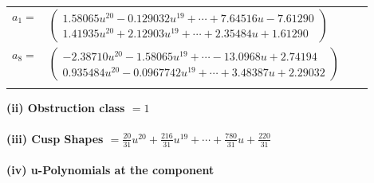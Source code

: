 \documentclass[1p]{elsarticle_modified}
\theoremstyle{definition}
\begin{document}
\begin{tabular}{m{7pt} m{180pt} m{7pt} m{180pt} }
\flushright $a_{1}=$&$\begin{pmatrix}1.58065 u^{20}-0.129032 u^{19}+\cdots+7.64516 u-7.61290\\1.41935 u^{20}+2.12903 u^{19}+\cdots+2.35484 u+1.61290\end{pmatrix}$ \\
\flushright $a_{8}=$&$\begin{pmatrix}-2.38710 u^{20}-1.58065 u^{19}+\cdots-13.0968 u+2.74194\\0.935484 u^{20}-0.0967742 u^{19}+\cdots+3.48387 u+2.29032\end{pmatrix}$\\&\end{tabular}
\flushleft \textbf{(ii) Obstruction class $= 1$}\\~\\
\flushleft \textbf{(iii) Cusp Shapes $= \frac{20}{31} u^{20}+\frac{216}{31} u^{19}+\cdots+\frac{780}{31} u+\frac{220}{31}$}\\~\\
\newpage\renewcommand{\arraystretch}{1}
\flushleft \textbf{(iv) u-Polynomials at the component}\newline \\
\end{document}
